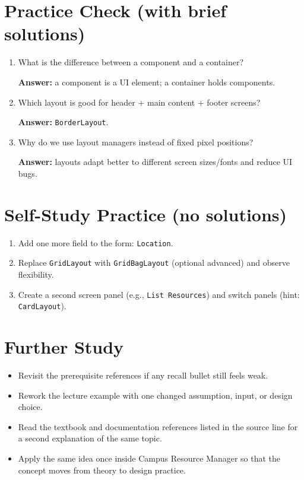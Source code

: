 \documentclass[11pt]{article}
\begin{document}
\section{Practice Check (with brief solutions)}
\begin{enumerate}
  \item What is the difference between a component and a container?\par
  \textbf{Answer:} a component is a UI element; a container holds components.

  \item Which layout is good for header + main content + footer screens?\par
  \textbf{Answer:} \texttt{BorderLayout}.

  \item Why do we use layout managers instead of fixed pixel positions?\par
  \textbf{Answer:} layouts adapt better to different screen sizes/fonts and reduce UI bugs.
\end{enumerate}

\section{Self-Study Practice (no solutions)}
\begin{enumerate}
  \item Add one more field to the form: \texttt{Location}.
  \item Replace \texttt{GridLayout} with \texttt{GridBagLayout} (optional advanced) and observe flexibility.
  \item Create a second screen panel (e.g., \texttt{List Resources}) and switch panels (hint: \texttt{CardLayout}).
\end{enumerate}

\section{Further Study}
\begin{itemize}
  \item Revisit the prerequisite references if any recall bullet still feels weak.
  \item Rework the lecture example with one changed assumption, input, or design choice.
  \item Read the textbook and documentation references listed in the source line for a second explanation of the same topic.
  \item Apply the same idea once inside Campus Resource Manager so that the concept moves from theory to design practice.
\end{itemize}
\notesources{\OOPSUnitIVSources}
\end{document}
